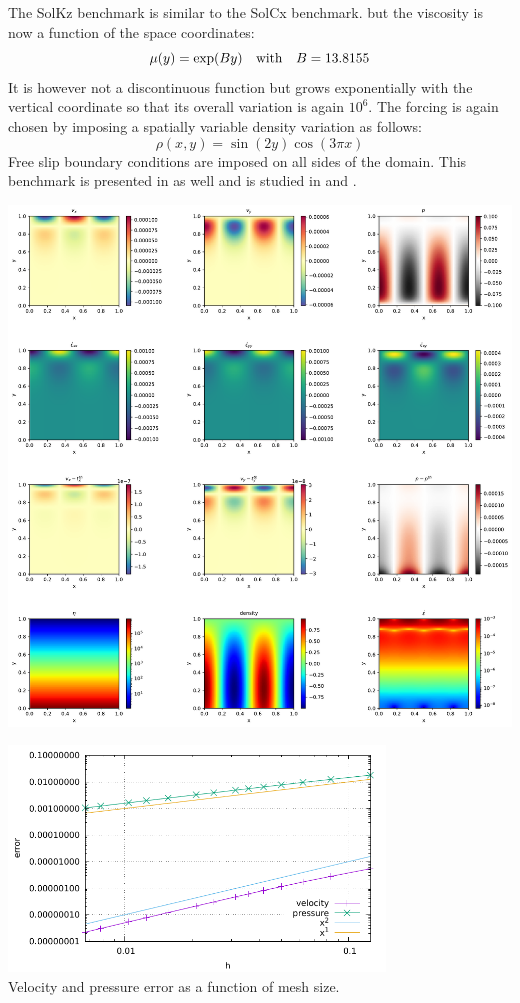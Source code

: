 

The SolKz benchmark \cite{repa87} is similar to the SolCx benchmark.
but the viscosity is now a function of the space coordinates: 
\begin{equation}
\mu(y)=\exp(By) \quad {\rm with} \quad B=13.8155
\end{equation}
It is however not a discontinuous function but grows exponentially with the vertical coordinate so that its overall variation is again $10^6$. 
The forcing is again chosen by imposing a spatially variable density variation as follows:
\begin{equation}
\rho(x,y)=\sin(2y) \cos(3\pi x)
\end{equation}
Free slip boundary conditions are imposed on all sides of the domain.
This benchmark is presented in \cite{zhon96} as well and is studied in \cite{dumg11} and \cite{gemd13}.

\includegraphics[width=14cm]{python_codes/fieldstone_06/results/solution.pdf}

\begin{center}
\includegraphics[width=10cm]{python_codes/fieldstone_06/results/errors.pdf}\\
{\captionfont Velocity and pressure error as a function of mesh size.}
\end{center}
